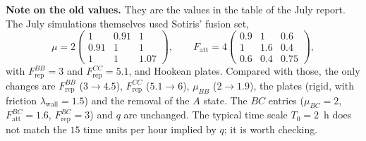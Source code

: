 \documentclass{article}
\begin{document}
\textbf{Note on the old values.} They are the values in the table of the July report. The July simulations themselves used Sotiris' fusion set,
\begin{equation*}
    \mu = 2\begin{pmatrix} 1 & 0.91 & 1 \\ 0.91 & 1 & 1 \\ 1 & 1 & 1.07 \end{pmatrix}, \qquad
    F_\text{att} = 4\begin{pmatrix} 0.9 & 1 & 0.6 \\ 1 & 1.6 & 0.4 \\ 0.6 & 0.4 & 0.75 \end{pmatrix},
\end{equation*}
with $F_\text{rep}^{BB} = 3$ and $F_\text{rep}^{CC} = 5.1$, and Hookean plates. Compared with those, the only changes are $F_\text{rep}^{BB}$ ($3 \to 4.5$), $F_\text{rep}^{CC}$ ($5.1 \to 6$), $\mu_{BB}$ ($2 \to 1.9$), the plates (rigid, with friction $\lambda_\text{wall} = 1.5$) and the removal of the $A$ state. The $BC$ entries ($\mu_{BC}=2$, $F_\text{att}^{BC}=1.6$, $F_\text{rep}^{BC}=3$) and $q$ are unchanged. The typical time scale $T_0 = 2$~h does not match the $15$ time units per hour implied by $q$; it is worth checking.

\printbibliography
\end{document}
